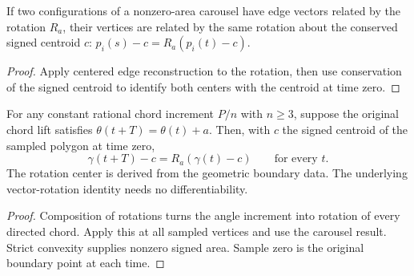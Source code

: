 \begin{proposition}
\label{prop:carousel-rotated-edges}
\leanok
{}
If two configurations of a nonzero-area carousel have edge vectors
related by the rotation $R_a$, their vertices are related by the same
rotation about the conserved signed centroid $c$:
$p_i(s)-c=R_a(p_i(t)-c)$.
\end{proposition}
\begin{proof}
\leanok
Apply centered edge reconstruction to the rotation, then use conservation
of the signed centroid to identify both centers with the centroid at time zero.
\end{proof}

\begin{proposition}
\label{prop:chord-boundary-rotation}
\leanok
{}
For any constant rational chord increment $P/n$ with $n\geq3$,
suppose the original chord lift satisfies $\theta(t+T)=\theta(t)+a$.
Then, with $c$ the signed centroid of the sampled polygon at time zero,
\[
 \gamma(t+T)-c=R_a(\gamma(t)-c)\qquad\text{for every }t.
\]
The rotation center is derived from the geometric boundary data.
The underlying vector-rotation identity needs no differentiability.
\end{proposition}
\begin{proof}
\leanok
Composition of rotations turns the angle increment into rotation of
every directed chord. Apply this at all sampled vertices and use the
carousel result. Strict convexity supplies nonzero signed area. Sample
zero is the original boundary point at each time.
\end{proof}

